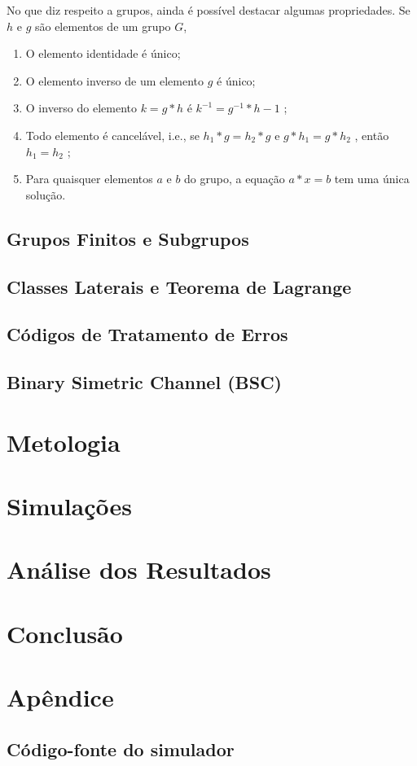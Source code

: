 \documentclass[]{article}
\begin{document}
No que diz respeito a grupos, ainda é possível destacar algumas propriedades. Se $h$ e $g$ são elementos de um grupo $G$, 

\begin{enumerate}[PG1.]
	\item O elemento identidade é único;
	\item O elemento inverso de um elemento $g$ é único;
	\item  O inverso do elemento $k = g*h$ é $k^{-1}=g^{-1}*h-1$ ;
	\item Todo elemento é cancelável, i.e., se $h _ 1 * g = h _ 2 * g$ e $g*h _ 1 = g*h _ 2$ , então $h _ 1 = h _ 2$ ;
	\item Para quaisquer elementos $a$ e $b$ do grupo, a equação $a*x =b$ tem uma única
	solução.
\end{enumerate}

\subsection{Grupos Finitos e Subgrupos}
\subsection{Classes Laterais e Teorema de Lagrange}
\subsection{Códigos de Tratamento de Erros}
\subsection{Binary Simetric Channel (BSC)}

\section{Metologia}
\section{Simulações}

\section{Análise dos Resultados}

\section{Conclusão}

\appendix
\section{Apêndice}
\subsection{Código-fonte do simulador}
\end{document}
